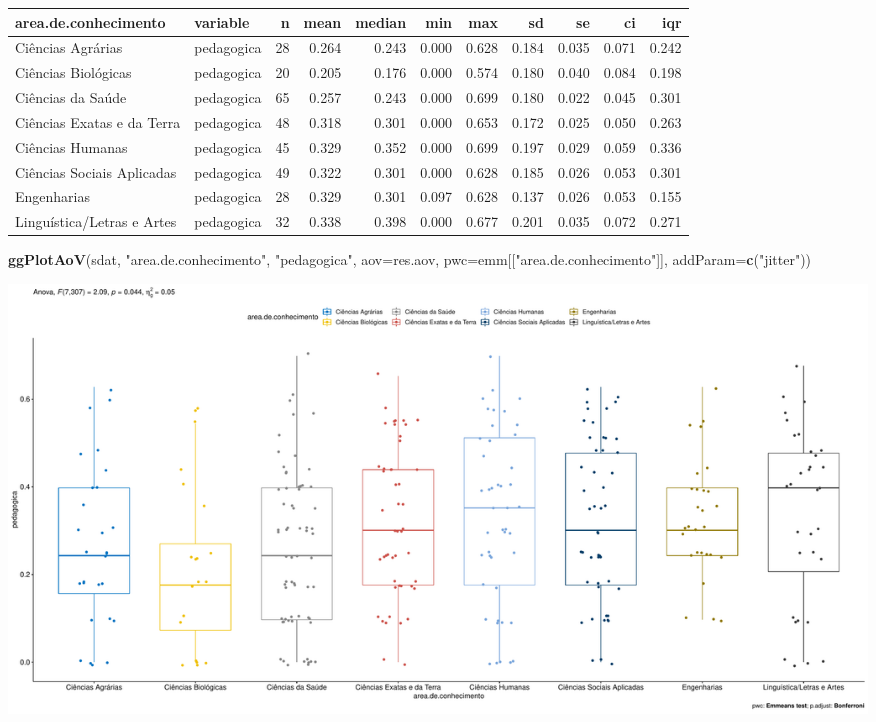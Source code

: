 \documentclass[]{article}
\newenvironment{Shaded}{\begin{snugshade}}{\end{snugshade}}
\newcommand{\DataTypeTok}[1]{\textcolor[rgb]{0.13,0.29,0.53}{#1}}
\newcommand{\KeywordTok}[1]{\textcolor[rgb]{0.13,0.29,0.53}{\textbf{#1}}}
\newcommand{\NormalTok}[1]{#1}
\newcommand{\StringTok}[1]{\textcolor[rgb]{0.31,0.60,0.02}{#1}}
\begin{document}
\begin{longtable}[]{@{}llrrrrrrrrr@{}}
\toprule
area.de.conhecimento & variable & n & mean & median & min & max & sd &
se & ci & iqr\tabularnewline
\midrule
\endhead
Ciências Agrárias & pedagogica & 28 & 0.264 & 0.243 & 0.000 & 0.628 &
0.184 & 0.035 & 0.071 & 0.242\tabularnewline
Ciências Biológicas & pedagogica & 20 & 0.205 & 0.176 & 0.000 & 0.574 &
0.180 & 0.040 & 0.084 & 0.198\tabularnewline
Ciências da Saúde & pedagogica & 65 & 0.257 & 0.243 & 0.000 & 0.699 &
0.180 & 0.022 & 0.045 & 0.301\tabularnewline
Ciências Exatas e da Terra & pedagogica & 48 & 0.318 & 0.301 & 0.000 &
0.653 & 0.172 & 0.025 & 0.050 & 0.263\tabularnewline
Ciências Humanas & pedagogica & 45 & 0.329 & 0.352 & 0.000 & 0.699 &
0.197 & 0.029 & 0.059 & 0.336\tabularnewline
Ciências Sociais Aplicadas & pedagogica & 49 & 0.322 & 0.301 & 0.000 &
0.628 & 0.185 & 0.026 & 0.053 & 0.301\tabularnewline
Engenharias & pedagogica & 28 & 0.329 & 0.301 & 0.097 & 0.628 & 0.137 &
0.026 & 0.053 & 0.155\tabularnewline
Linguística/Letras e Artes & pedagogica & 32 & 0.338 & 0.398 & 0.000 &
0.677 & 0.201 & 0.035 & 0.072 & 0.271\tabularnewline
\bottomrule
\end{longtable}

\begin{Shaded}
\begin{Highlighting}[]
\KeywordTok{ggPlotAoV}\NormalTok{(sdat, }\StringTok{"area.de.conhecimento"}\NormalTok{, }\StringTok{"pedagogica"}\NormalTok{, }\DataTypeTok{aov=}\NormalTok{res.aov, }\DataTypeTok{pwc=}\NormalTok{emm[[}\StringTok{"area.de.conhecimento"}\NormalTok{]], }\DataTypeTok{addParam=}\KeywordTok{c}\NormalTok{(}\StringTok{"jitter"}\NormalTok{))}
\end{Highlighting}
\end{Shaded}

\includegraphics{factorialAnova_files/figure-latex/unnamed-chunk-37-1.pdf}
\end{document}
